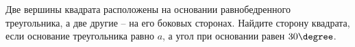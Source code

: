 \begin{ex}
	\begin{condition}
		Две вершины квадрата расположены на основании равнобедренного треугольника, а две другие – на его боковых сторонах. Найдите сторону квадрата, если основание треугольника равно \( a \), а угол при основании равен \( 30\degree \).
	\end{condition}
\end{ex}